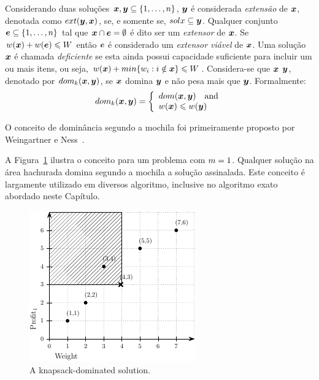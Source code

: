 Considerando duas soluções $\boldsymbol{x}, \boldsymbol{y} \subseteq \{1, \ldots, n\}$,
$\boldsymbol{y}$ é considerada \emph{extensão} de $\boldsymbol{x}$, denotada como $ext(\boldsymbol{y}, \boldsymbol{x})$,
se, e somente se, $sol{x} \subseteq \boldsymbol{y}$.
Qualquer conjunto $\boldsymbol{e} \subseteq \{1, \ldots, n\}$ tal que $\boldsymbol{x} \cap \boldsymbol{e} = \emptyset$
é dito ser um \emph{extensor} de $\boldsymbol{x}$.
Se $w(\boldsymbol{x}) + w(\boldsymbol{e}) \leqslant W$ então $\boldsymbol{e}$ é considerado um
\emph{extensor viável} de $\boldsymbol{x}$.
Uma solução $\boldsymbol{x}$ é chamada \emph{deficiente} se esta ainda possui capacidade
suficiente para incluir um ou mais itens, ou seja, $w(\boldsymbol{x}) + min\{ w_i : i \notin \boldsymbol{x} \} \leqslant W$.
Considera-se que $\boldsymbol{x}$ \emph{\knapsackdominates} $\boldsymbol{y}$, denotado por
$dom_k(\boldsymbol{x}, \boldsymbol{y})$, se $\boldsymbol{x}$ domina $\boldsymbol{y}$ e não pesa mais que $\boldsymbol{y}$.
Formalmente:
\begin{equation}
  \label{eq:kdom}
  dom_k(\boldsymbol{x}, \boldsymbol{y}) = \left\{
    \begin{array}{l}
      dom(\boldsymbol{x}, \boldsymbol{y}) \quad \text{and} \\
      w(\boldsymbol{x}) \leqslant w(\boldsymbol{y})
    \end{array}
  \right.
\end{equation}

O conceito de dominância segundo a mochila foi primeiramente proposto por
Weingartner e Ness~\cite{weingartner1967methods}.

A Figura~\ref{fig:kdom} ilustra o conceito para um problema com $m = 1$.
Qualquer solução na área hachurada domina segundo a mochila a solução assinalada.
Este conceito é largamente utilizado em diversos algoritmo, inclusive no
algoritmo exato abordado neste Capítulo.

\begin{figure}
  \centering
  \includegraphics[scale=1.2]{img/kdt/dom}
  \caption{A knapsack-dominated solution.}
  \label{fig:kdom}
\end{figure}
